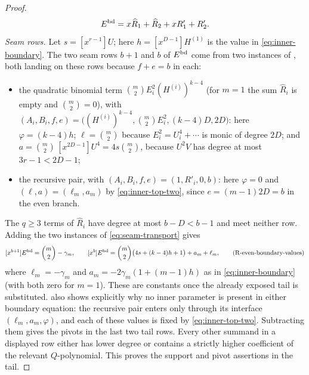 \begin{proof}
      \[
        E^{\rm bd}=x\widehat R_1+\widehat R_2+xR'_1+R'_2.
      \]
      \smallskip\noindent\emph{Seam rows.}
      Let $s=[x^{r-1}]U$; here $h=[x^{D-1}]H^{(1)}$ is the value in
      \eqref{eq:inner-boundary}.  The two seam rows $b+1$ and $b$ of
      $E^{\rm bd}$ come from two instances of ,
      both landing on these rows because $f+e=b$ in each:
      \begin{itemize}
        \item the quadratic binomial term
        $\binom m2E_i^2(H^{(i)})^{k-4}$ (for $m=1$ the sum $\widehat R_i$ is
        empty and $\binom m2=0$), with
        $(A_i,B_i,f,e)=\bigl((H^{(i)})^{k-4},\binom m2E_i^2,(k-4)D,2D\bigr)$:
        here $\varphi=(k-4)h$; $\ell=\binom m2$ because
        $E_i^2=U_i^4+\cdots$ is monic of degree $2D$; and
        $a=\binom m2\,[x^{2D-1}]U^4=4s\binom m2$, because $U^2V$ has degree
        at most $3r-1<2D-1$;
        \item the recursive pair, with $(A_i,B_i,f,e)=(1,R'_i,0,b)$: here
        $\varphi=0$ and $(\ell,a)=(\ell_m,a_m)$ by \eqref{eq:inner-top-two},
        since $e=(m-1)2D=b$ in the even branch.
      \end{itemize}
      The $q\ge3$ terms of $\widehat R_i$ have degree at most $b-D<b-1$ and
      meet neither row.  Adding the two instances of
      \eqref{eq:seam-transport} gives
      \[
        [x^{b+1}]E^{\rm bd}=\binom m2-\gamma_m,\qquad
        [x^{b}]E^{\rm bd}
        =\binom m2\bigl(4s+(k-4)h+1\bigr)+a_m+\ell_m,
        \tag{R-even-boundary-values}\label{eq:R-even-boundary-values}
      \]
      where $\ell_m=-\gamma_m$ and
      $a_m=-2\gamma_m(1+(m-1)h)$ as in \eqref{eq:inner-boundary} (with both
      zero for $m=1$).
      These are constants once the already exposed tail is substituted.
       also shows explicitly why no inner parameter
      is present in either boundary equation: the recursive pair enters only
      through its interface $(\ell_m,a_m,\varphi)$, and each of these values
      is fixed by \eqref{eq:inner-top-two}.
      Subtracting them gives the pivots in the last two tail rows.  Every
      other summand in a displayed row either has lower degree or contains a
      strictly higher coefficient of the relevant $Q$-polynomial.  This proves
      the support and pivot assertions in the tail.


\end{proof}
